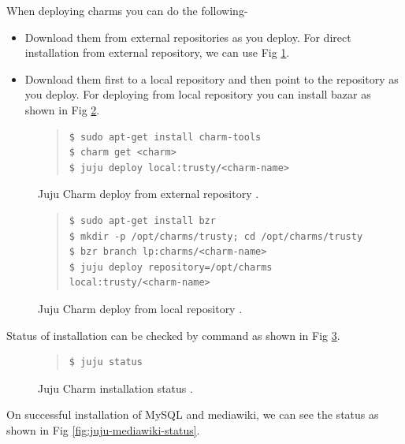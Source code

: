 \documentclass[9pt,twocolumn,twoside]{../../styles/osajnl}
\begin{document}
When deploying charms you can do the following-
\begin{itemize}
\item[1.] Download them from external repositories as you deploy. For
  direct installation from external repository, we can use Fig
  \ref{fig:charm-deploy}.

\item[2.] Download them first to a local repository and then point to
  the repository as you deploy. For deploying from local repository
  you can install bazar as shown in Fig \ref{fig:charm-deploy-local}.
  
\end{itemize}


\begin{figure}
  \caption{Juju Charm deploy from external repository \cite{www-juju}.}
  \label{fig:charm-deploy}
  \begin{quote}
    \begin{Verbatim}
$ sudo apt-get install charm-tools
$ charm get <charm>
$ juju deploy local:trusty/<charm-name>
    \end{Verbatim}
  \end{quote}
\end{figure}


\begin{figure}
  \caption{Juju Charm deploy from local repository \cite{juju-paper}.}
  \label{fig:charm-deploy-local}
  \begin{quote}
    \begin{Verbatim}
$ sudo apt-get install bzr
$ mkdir -p /opt/charms/trusty; cd /opt/charms/trusty
$ bzr branch lp:charms/<charm-name>
$ juju deploy repository=/opt/charms local:trusty/<charm-name>
    \end{Verbatim}
  \end{quote}
\end{figure}


Status of installation can be checked by command as shown in Fig
\ref{fig:deploy-status}.
\begin{figure}
  \caption{Juju Charm installation status \cite{www-juju}.}
  \label{fig:deploy-status}
  \begin{quote}
    \begin{Verbatim}
$ juju status
    \end{Verbatim}
  \end{quote}
\end{figure}

On successful installation of MySQL and mediawiki, we can see the status
as shown in Fig \ref{fig:juju-mediawiki-status}.
\end{document}
